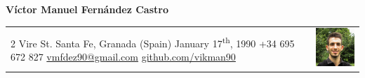 \documentclass[12pt,a4paper]{article}
\begin{document}
	\sffamily
	\large
	
	\begin{center}
		\textbf{Víctor Manuel Fernández Castro}
	\end{center}

	\normalsize
	\centering

	\begin{tabular}{m{}m{}}
		2 Vire St. \newline
		Santa Fe, Granada (Spain) \newline
		January 17\textsuperscript{th}, 1990 \newline
		\newline
		+34 695 672 827 \newline
		\href{mailto:vmfdez90@gmail.com}{vmfdez90@gmail.com} \newline
		\href{https://github.com/vikman90}{github.com/vikman90} &
		\includegraphics[width=3cm]{victor}
	\end{tabular}
	
	\medskip
	
	
\end{document}
